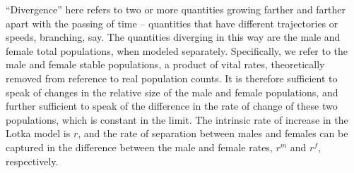 \label{sec:Divergence}
``Divergence'' here refers to two or more quantities growing farther and
farther apart with the passing of time -- quantities that have different
trajectories or speeds, branching, say. The quantities diverging in this way are
the male and female total populations, when modeled separately. Specifically, we refer to
the male and female stable populations, a product of vital rates,
theoretically removed from reference to real population counts. It is therefore
sufficient to speak of changes in the relative size of the male and female
populations, and further sufficient to speak of the
difference in the rate of change of these two populations, which is constant in
the limit. The intrinsic rate of increase in the Lotka model is $r$, and the
rate of separation between males and females can be captured in the difference
between the male and female rates, $r^m$ and $r^f$, respectively.
